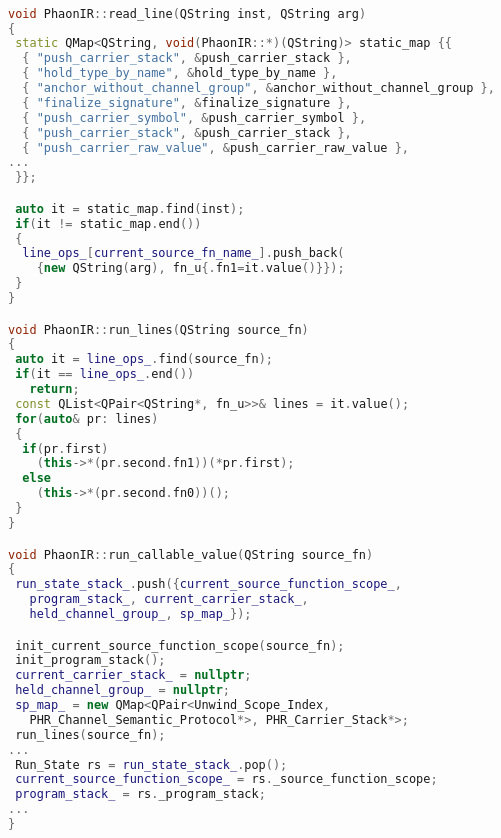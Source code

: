 \begin{lstlisting}[caption={PVMIR to Member-Function Pointers},
language = C++, numbers = none, label={lst:figPVMlines},
    basicstyle = \ttfamily\bfseries\tiny, linewidth = .95\linewidth] 

void PhaonIR::read_line(QString inst, QString arg)
{
 static QMap<QString, void(PhaonIR::*)(QString)> static_map {{
  { "push_carrier_stack", &push_carrier_stack },
  { "hold_type_by_name", &hold_type_by_name },
  { "anchor_without_channel_group", &anchor_without_channel_group },
  { "finalize_signature", &finalize_signature },
  { "push_carrier_symbol", &push_carrier_symbol },
  { "push_carrier_stack", &push_carrier_stack },
  { "push_carrier_raw_value", &push_carrier_raw_value },
...
 }};

 auto it = static_map.find(inst);
 if(it != static_map.end())
 {
  line_ops_[current_source_fn_name_].push_back(
    {new QString(arg), fn_u{.fn1=it.value()}});
 }
}

void PhaonIR::run_lines(QString source_fn)
{
 auto it = line_ops_.find(source_fn);
 if(it == line_ops_.end())
   return;
 const QList<QPair<QString*, fn_u>>& lines = it.value();
 for(auto& pr: lines)
 {
  if(pr.first)
    (this->*(pr.second.fn1))(*pr.first);
  else
    (this->*(pr.second.fn0))();
 }
}

void PhaonIR::run_callable_value(QString source_fn)
{
 run_state_stack_.push({current_source_function_scope_,
   program_stack_, current_carrier_stack_,
   held_channel_group_, sp_map_});

 init_current_source_function_scope(source_fn);
 init_program_stack();
 current_carrier_stack_ = nullptr;
 held_channel_group_ = nullptr;
 sp_map_ = new QMap<QPair<Unwind_Scope_Index,
   PHR_Channel_Semantic_Protocol*>, PHR_Carrier_Stack*>;
 run_lines(source_fn);
...
 Run_State rs = run_state_stack_.pop();
 current_source_function_scope_ = rs._source_function_scope;
 program_stack_ = rs._program_stack;
...
}

\end{lstlisting}
